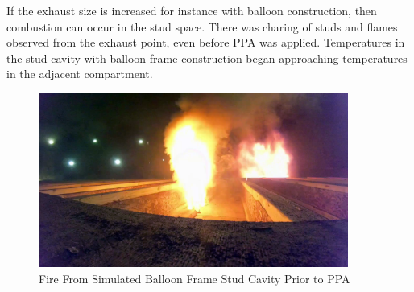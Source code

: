 \documentclass{article}
\begin{document}
If the exhaust size is increased for instance with balloon construction, then combustion can occur in the stud space. There was charing of studs and flames observed from the exhaust point, even before PPA was applied. Temperatures in the stud cavity with balloon frame construction began approaching temperatures in the adjacent compartment. 

\begin{figure}[H]
	\centering
	\includegraphics[width = 4in]{0_Images/Tactical_Considerations/Void_Space_Extension/FireBeforeFan.png}
	\caption{Fire From Simulated Balloon Frame Stud Cavity Prior to PPA}
	\label{fig:FireBeforeFan}
\end{figure}
\end{document}
